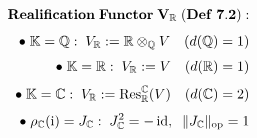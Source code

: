 \documentclass[preview]{standalone}
\begin{document}
\begin{align*}
\special{dvisvgm:raw <g id='unique000'>}\mathbf{Realification\;Functor\;V_{\mathbb{R}}\;(Def\;7.2):}\\[4pt]\bullet\;\mathbb{K}=\mathbb{Q}:\; V_{\mathbb{R}} := \mathbb{R}\otimes_{\mathbb{Q}} V\quad(d(\mathbb{Q})=1)\\[3pt]\bullet\;\mathbb{K}=\mathbb{R}:\; V_{\mathbb{R}} := V\quad(d(\mathbb{R})=1)\\[3pt]\bullet\;\mathbb{K}=\mathbb{C}:\; V_{\mathbb{R}} := \operatorname{Res}_{\mathbb{R}}^{\mathbb{C}}(V)\quad(d(\mathbb{C})=2)\\[3pt]\bullet\;\rho_{\mathbb{C}}(\mathrm{i}) = J_{\mathbb{C}}:\; J_{\mathbb{C}}^2 = -\operatorname{id},\;\;\|J_{\mathbb{C}}\|_{\text{op}} = 1\special{dvisvgm:raw </g>}
\end{align*}
\end{document}
